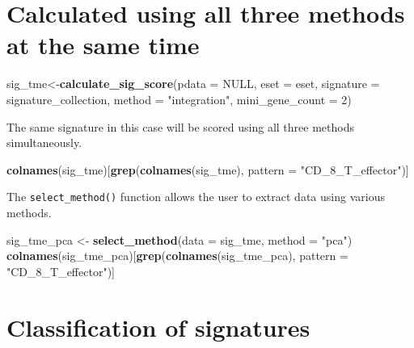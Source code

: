 \documentclass[
  12pt,
]{book}
\newenvironment{Shaded}{\begin{snugshade}}{\end{snugshade}}
\newcommand{\AttributeTok}[1]{\textcolor[rgb]{0.13,0.29,0.53}{#1}}
\newcommand{\ConstantTok}[1]{\textcolor[rgb]{0.56,0.35,0.01}{#1}}
\newcommand{\DecValTok}[1]{\textcolor[rgb]{0.00,0.00,0.81}{#1}}
\newcommand{\FunctionTok}[1]{\textcolor[rgb]{0.13,0.29,0.53}{\textbf{#1}}}
\newcommand{\NormalTok}[1]{#1}
\newcommand{\OtherTok}[1]{\textcolor[rgb]{0.56,0.35,0.01}{#1}}
\newcommand{\StringTok}[1]{\textcolor[rgb]{0.31,0.60,0.02}{#1}}
\begin{document}
\hypertarget{calculated-using-all-three-methods-at-the-same-time}{%
\section{Calculated using all three methods at the same time}\label{calculated-using-all-three-methods-at-the-same-time}}

\begin{Shaded}
\begin{Highlighting}[]
\NormalTok{sig\_tme}\OtherTok{\textless{}{-}}\FunctionTok{calculate\_sig\_score}\NormalTok{(}\AttributeTok{pdata           =} \ConstantTok{NULL}\NormalTok{,}
                             \AttributeTok{eset            =}\NormalTok{ eset,}
                             \AttributeTok{signature       =}\NormalTok{ signature\_collection,}
                             \AttributeTok{method          =} \StringTok{"integration"}\NormalTok{,}
                             \AttributeTok{mini\_gene\_count =} \DecValTok{2}\NormalTok{)}
\end{Highlighting}
\end{Shaded}

The same signature in this case will be scored using all three methods simultaneously.

\begin{Shaded}
\begin{Highlighting}[]
\FunctionTok{colnames}\NormalTok{(sig\_tme)[}\FunctionTok{grep}\NormalTok{(}\FunctionTok{colnames}\NormalTok{(sig\_tme), }\AttributeTok{pattern =} \StringTok{"CD\_8\_T\_effector"}\NormalTok{)]}
\end{Highlighting}
\end{Shaded}

The \texttt{select\_method()} function allows the user to extract data using various methods.

\begin{Shaded}
\begin{Highlighting}[]
\NormalTok{sig\_tme\_pca }\OtherTok{\textless{}{-}} \FunctionTok{select\_method}\NormalTok{(}\AttributeTok{data =}\NormalTok{ sig\_tme, }\AttributeTok{method =} \StringTok{"pca"}\NormalTok{)}
\FunctionTok{colnames}\NormalTok{(sig\_tme\_pca)[}\FunctionTok{grep}\NormalTok{(}\FunctionTok{colnames}\NormalTok{(sig\_tme\_pca), }\AttributeTok{pattern =} \StringTok{"CD\_8\_T\_effector"}\NormalTok{)]}
\end{Highlighting}
\end{Shaded}

\hypertarget{classification-of-signatures}{%
\section{Classification of signatures}\label{classification-of-signatures}}
\end{document}
